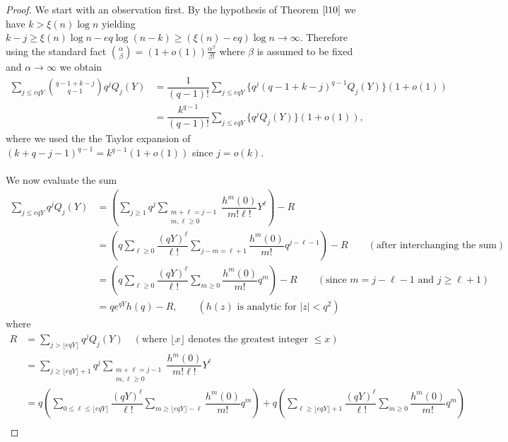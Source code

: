 \documentclass[12pt]{amsart}
\numberwithin{equation}{section}
\theoremstyle{remark}
\theoremstyle{remark}
\theoremstyle{definition}
\begin{document}
\begin{proof}
We start with an observation first. By the hypothesis of Theorem $\ref{l10}$ we have $k>\xi(n)\log n$ yielding $k-j\geqslant \xi(n)\log n-eq\log (n-k)\geqslant (\xi(n)-eq)\log n\to\infty$. Therefore using the standard fact $\binom{\alpha}{\beta}=(1+o(1))\frac{\alpha^{\beta}}{\beta!}$ where $\beta$ is assumed to be fixed and $\alpha\to\infty$ we obtain 
\begin{align}
\nonumber
\displaystyle\sum\limits_{j\leqslant eqY}\displaystyle\binom{q-1+k-j}{q-1}q^j Q_j(Y) &= \dfrac{1}{(q-1)!}\displaystyle\sum\limits_{j\leqslant eqY}\Big \{q^j(q-1+k-j)^{q-1}Q_j(Y)\Big\}(1+o(1))\\
\nonumber
&=\dfrac{k^{q-1}}{(q-1)!}\displaystyle\sum\limits_{j\leqslant eqY}\Big \{q^jQ_j(Y)\Big\}(1+o(1)),
\end{align}
where we used the the Taylor expansion of $\left(k+q-j-1\right)^{q-1}=k^{q-1}(1+o(1))$ since $j=o(k).$\\\\
We now evaluate the sum
\begin{align}
\nonumber
\displaystyle\sum\limits_{j\leqslant eqY}q^jQ_j(Y) &=\left(\displaystyle\sum\limits_{j\geqslant 1} q^j \sum\limits_{\substack{m+\ell=j-1 \\ m,\ell\geqslant 0}}\dfrac{h^{m}(0)}{m!\ell!}Y^\ell\right)- R\\
\nonumber
 &=\left(q\displaystyle\sum\limits_{\ell\geqslant 0} \dfrac{(qY)^\ell}{\ell!} \sum\limits_{j-m=\ell+1}\dfrac{h^{m}(0)}{m!}q^{j-\ell-1}\right)-R\qquad (\text{after interchanging the sum})\\
 \nonumber
 &=\left(q\displaystyle\sum\limits_{\ell\geqslant 0}\dfrac{(qY)^\ell}{\ell!} \sum\limits_{m\geqslant 0}\dfrac{h^{m}(0)}{m!}q^{m}\right)-R\qquad (\text{since }m=j-\ell-1\text{ and } j\geqslant \ell+1)\\
\nonumber
&=qe^{qY}h(q)-R,\qquad (\text{$h(z)$ is analytic for $|z|<q^2$})
\end{align}
where
\begin{align}
\nonumber
R &= \sum\limits_{j>\lfloor eqY\rfloor}q^j Q_j(Y)\quad (\text{where }\lfloor x\rfloor \text{ denotes the greatest integer }\leqslant x)\\
\nonumber
&= \displaystyle\sum\limits_{j\geqslant\lfloor eqY\rfloor+1} q^j \sum\limits_{\substack{m+\ell=j-1 \\ m,\ell\geqslant 0}}\dfrac{h^{m}(0)}{m!\ell!}Y^\ell\\
\nonumber
&= q\left(\displaystyle\sum\limits_{0\leqslant \ell\leqslant\lfloor eqY\rfloor} \dfrac{(qY)^\ell}{\ell!} \sum\limits_{m\geqslant\lfloor eqY\rfloor-\ell}\dfrac{h^{m}(0)}{m!}q^m\right)+q\left(\displaystyle\sum\limits_{\ell\geqslant\lfloor eqY\rfloor+1} \dfrac{(qY)^\ell}{\ell!} \sum\limits_{m\geqslant 0}\dfrac{h^{m}(0)}{m!}q^m\right)\\

\end{align}
\end{proof}
\end{document}

